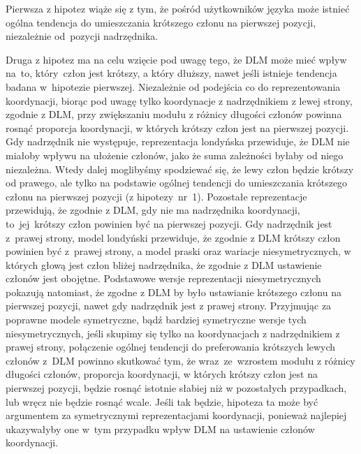 \documentclass[licencjacka]{pracamgr_Kogni}
\begin{document}
    Pierwsza z hipotez wiąże się z tym, że pośród użytkowników języka może istnieć ogólna tendencja do umieszczania krótszego członu na pierwszej pozycji, niezależnie od~pozycji nadrzędnika.

    Druga z hipotez ma na celu wzięcie pod uwagę tego, że DLM może mieć wpływ na~to, który~człon jest krótszy, a który dłuższy, nawet jeśli istnieje tendencja badana w~hipotezie pierwszej.
    Niezależnie od podejścia co do reprezentowania koordynacji, biorąc pod uwagę tylko koordynacje z nadrzędnikiem z lewej strony, zgodnie z DLM, przy zwiększaniu modułu z różnicy długości członów powinna rosnąć proporcja koordynacji, w których krótszy człon jest na pierwszej pozycji.
    Gdy nadrzędnik nie występuje, reprezentacja londyńska przewiduje, że DLM nie miałoby wpływu na ułożenie członów, jako że suma zależności byłaby od niego niezależna.
    Wtedy dalej moglibyśmy spodziewać się, że lewy człon będzie krótszy od prawego, ale tylko na podstawie ogólnej tendencji do umieszczania krótszego członu na pierwszej pozycji (z hipotezy~nr~1).
    Pozostałe reprezentacje przewidują, że zgodnie z DLM, gdy nie ma nadrzędnika koordynacji, to~jej~krótszy człon powinien być na pierwszej pozycji.
    Gdy nadrzędnik jest z~prawej strony, model londyński przewiduje, że zgodnie z DLM krótszy człon powinien być z~prawej strony, a model praski oraz wariacje niesymetrycznych, w których głową jest człon bliżej nadrzędnika, że zgodnie z DLM ustawienie członów jest obojętne.
    Podstawowe wersje reprezentacji niesymetrycznych pokazują natomiast, że zgodne z DLM by było ustawianie krótszego członu na pierwszej pozycji, nawet gdy nadrzędnik jest z prawej strony.
    Przyjmując za poprawne modele symetryczne, bądź bardziej symetryczne wersje tych niesymetrycznych, jeśli skupimy się tylko na koordynacjach z nadrzędnikiem z prawej strony, połączenie ogólnej tendencji do preferowania krótszych lewych członów z~DLM powinno skutkować tym, że wraz~ze~wzrostem modułu z różnicy długości członów, proporcja koordynacji, w których krótszy człon jest na pierwszej pozycji, będzie rosnąć istotnie słabiej niż w pozostałych przypadkach, lub wręcz nie będzie rosnąć wcale.
    Jeśli tak będzie, hipoteza ta może być argumentem za symetrycznymi reprezentacjami koordynacji, ponieważ najlepiej ukazywałyby one w~tym przypadku wpływ DLM na ustawienie członów koordynacji.
\end{document}
